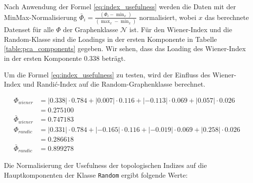 Nach Anwendung der Formel \ref{eq:index_usefulness} werden die Daten mit der MinMax-Normalisierung $ \bar{\Phi}_{i} = \frac{(\Phi_i - \min_x)}{(\max_x - \min_x)} $ normalisiert, wobei $x$ das berechnete Datenset für alle $ \Phi $ der Graphenklasse $ \mathcal{N} $ ist.
Für den Wiener-Index und die Random-Klasse sind die Loadings in der ersten Komponente in Tabelle \ref{table:pca_components} gegeben. Wir sehen, dass das Loading des Wiener-Index in der ersten Komponente $0.338$ beträgt.

Um die Formel \ref{eq:index_usefulness} zu testen, wird der Einfluss des Wiener-Index und Randić-Index auf die Random-Graphenklasse berechnet.

\begin{equation}
    \label{eq:test_index_usefulness}
    \begin{aligned}
        \Phi_{wiener}       & = |0.338| \cdot 0.784 + |0.007| \cdot 0.116 + |-0.113| \cdot 0.069 + |0.057| \cdot 0.026  \\
                            & = 0.275100                                                                                \\
        \bar{\Phi}_{wiener} & = 0.747183                                                                                \\
        \Phi_{randic}       & = |0.331| \cdot 0.784 + |-0.165| \cdot 0.116 + |-0.019| \cdot 0.069 + |0.258| \cdot 0.026 \\
                            & = 0.286618                                                                                \\
        \bar{\Phi}_{randic} & = 0.899278
    \end{aligned}
\end{equation}

Die Normalisierung der Usefulness der topologischen Indizes auf die Hauptkomponenten der Klasse \texttt{Random} ergibt folgende Werte:


